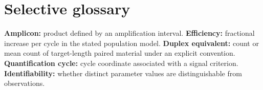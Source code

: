 \section*{Selective glossary}
\textbf{Amplicon:} product defined by an amplification interval.
\textbf{Efficiency:} fractional increase per cycle in the stated population model.
\textbf{Duplex equivalent:} count or mean count of target-length paired material under an explicit convention.
\textbf{Quantification cycle:} cycle coordinate associated with a signal criterion.
\textbf{Identifiability:} whether distinct parameter values are distinguishable from observations.
